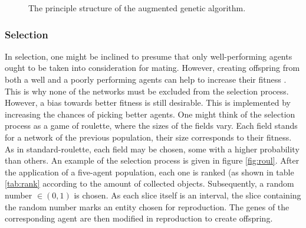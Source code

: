 \documentclass[10pt,a4paper,DIV=11]{scrreprt}
\begin{document}
\begin{figure}[H]
    \centering
\caption{The principle structure of the augmented genetic algorithm.\cite{CROSSOVER}}
\label{fig:ag}
\end{figure}

\subsubsection{Selection}
In selection, one might be inclined to presume that only well-performing agents ought to be taken into consideration for mating. However, creating
offspring from both a well and a poorly performing agents can help to increase their fitness \cite{KIKLAR}. This is why none
of the networks must be excluded from the selection process. However, a bias towards better fitness is still desirable. This is implemented by 
increasing the chances of picking better agents. One might think of the selection process as a game of roulette, where the sizes of the
fields vary. Each field stands for a network of the previous population, their size corresponds to their fitness. As in standard-roulette, each
field may be chosen, some with a higher probability than others. An example of the selection process is given in figure \ref{fig:roul}. After the 
application of a five-agent population, each one is ranked (as shown in table \ref{tab:rank} according to the amount of collected objects. 
Subsequently, a random number $\in (0,1)$ is chosen. As each slice itself is an interval, the slice containing the random number marks an entity 
chosen for reproduction. The genes of the corresponding agent are then modified in reproduction to create offspring.
  
\end{document}
